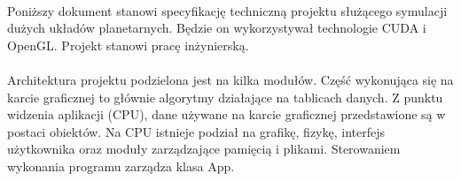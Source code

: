 \paragraph{}
Poniższy dokument stanowi specyfikację techniczną projektu służącego symulacji dużych układów planetarnych. Będzie on wykorzystywał technologie CUDA i OpenGL. Projekt stanowi pracę inżynierską.

\paragraph{}
Architektura projektu podzielona jest na kilka modułów. Część wykonująca się na karcie graficznej to głównie algorytmy działające na tablicach danych. Z punktu widzenia aplikacji (CPU), dane używane na karcie graficznej przedstawione są w postaci obiektów. Na CPU istnieje podział na grafikę, fizykę, interfejs użytkownika oraz moduły zarządzające pamięcią i plikami. Sterowaniem wykonania programu zarządza klasa App.

